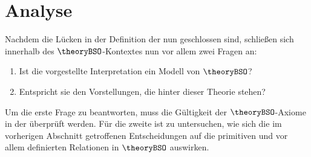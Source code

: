 %         
%     
% 
%                 

%     
%     
%     
% 
%         
%     
%     

\section{Analyse}\label{sec:analyse}
    Nachdem die Lücken in der Definition der \strukt nun geschlossen sind, schließen sich innerhalb des $\theoryBSO$-Kontextes nun vor allem zwei Fragen an:%
    \begin{enumerate}
        \item Ist die vorgestellte Interpretation ein Modell von $\theoryBSO$?
        \item Entspricht sie den Vorstellungen, die hinter dieser Theorie stehen?
    \end{enumerate}
%
    Um die erste Frage %
    zu beantworten, muss die Gültigkeit der $\theoryBSO$-Axiome in der \strukt überprüft werden.
    Für die zweite ist zu untersuchen, wie sich die im vorherigen Abschnitt getroffenen Entscheidungen auf die primitiven und vor allem definierten Relationen in $\theoryBSO$ auswirken.

